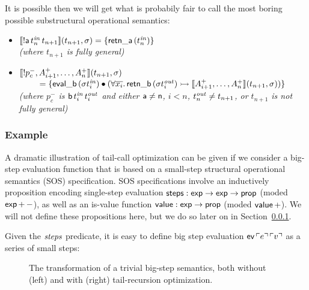 It is possible 
then we will get what is
probabily fair to call the most boring possible substructural
operational semantics: 



\begin{itemize}
\item $\llbracket {{!}{\sf a}\,t^{\it in}_n\,t_{n+1}} \rrbracket({t_{n+1}},{\sigma}) 
  = \{{\sf retn\_a}\,(t^{\it in}_n)\}$
\\
  {\it (where $t_{n+1}$ is fully general)}
\item $\llbracket {{!}p^-_c,A^+_{i+1},\ldots,A^+_n} \rrbracket({t_{n+1}},{\sigma})$
  \\
  $~ \qquad = \{ {\sf eval\_b}\,({\sigma}t^{\it in}_i) \mathbin{\bullet}
  (\forall\overline{x_i}.\, {\sf retn\_b}\,(\sigma{t^{\it out}_i})
  \rightarrowtail \llbracket {A^+_{i+1},\ldots,A^+_n} \rrbracket({t_{n+1}},{\sigma})) \}$\\
  {\it (where $p^-_c$ is ${\sf b}\,t^{\it in}_i\,t^{\it out}_i$ and
    either ${\sf a} \neq {\sf n}$, $i < n$, $t^{\it out}_n \neq t_{n+1}$, or
    $t_{n+1}$ is not fully general)}
\end{itemize}

\subsubsection{Example}

A dramatic illustration of tail-call optimization can be given if we
consider a big-step evaluation function that is based on a small-step
structural operational semantics (SOS) specification. SOS
specifications involve an inductively proposition encoding single-step
evaluation ${\sf steps} : {\sf exp} \rightarrow {\sf exp} \rightarrow
{\sf prop}$ (moded ${\sf exp}\,{+}\,{-}$), as well as an is-value
function ${\sf value} : {\sf exp} \rightarrow {\sf prop}$ (moded ${\sf
  value}\,{+}$). We will not define these propositions here, but 
we do so later on in Section~\ref{}.

Given the ${\it steps}$ predicate, it is easy to define big step
evaluation ${\sf ev}\,{\ulcorner{e}\urcorner}\,{\ulcorner{v}\urcorner}$ as a series of small
steps:

\smallskip
{}
\smallskip

\begin{figure}
\begin{minipage}[b]{0.55\linewidth}
\end{minipage}
\hspace{0.5cm}
\begin{minipage}[b]{0.45\linewidth}
\end{minipage}
\label{fig:sos-tailrecursion}
\caption{The transformation of a trivial big-step semantics, both
  without (left) and with (right) tail-recursion optimization.}
\end{figure}

